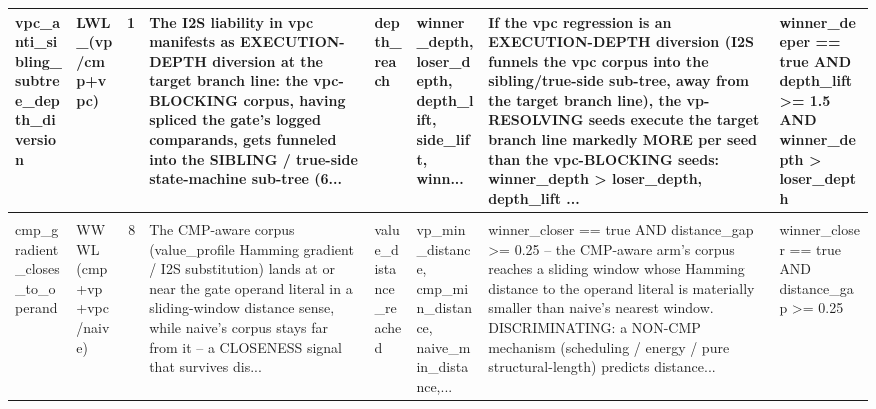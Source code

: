 \documentclass[7pt]{extarticle}
\begin{document}
{\begin{longtable}{@{}p{2.4cm}p{1.9cm}rp{4.3cm}p{1.5cm}p{1.7cm}p{4.6cm}p{3.0cm}@{}}
vpc\_\allowbreak anti\_\allowbreak sibling\_\allowbreak subtree\_\allowbreak depth\_\allowbreak diversion & LWL\_\allowbreak  (vp/cmp+vpc) & 1 & The I2S liability in vpc manifests as EXECUTION-DEPTH diversion at the target branch line: the vpc-BLOCKING corpus, having spliced the gate's logged comparands, gets funneled into the SIBLING / true-side state-machine sub-tree (6... & depth\_\allowbreak reach & winner\_\allowbreak depth, loser\_\allowbreak depth, depth\_\allowbreak lift, side\_\allowbreak lift, winn... & If the vpc regression is an EXECUTION-DEPTH diversion (I2S funnels the vpc corpus into the sibling/true-side sub-tree, away from the target branch line), the vp-RESOLVING seeds execute the target branch line markedly MORE per seed than the vpc-BLOCKING seeds: winner\_\allowbreak depth \textgreater{} loser\_\allowbreak depth, depth\_\allowbreak lift ... & winner\_\allowbreak deeper == true AND depth\_\allowbreak lift \textgreater{}= 1.5 AND winner\_\allowbreak depth \textgreater{} loser\_\allowbreak depth\\
\midrule
\rowcolor{black!10}\multicolumn{8}{@{}l}{\textbf{[VP-pro]\ \ vp\_\allowbreak gradient\_\allowbreak value\_\allowbreak distance\_\allowbreak closure}\quad(final feature, n=28)}\\
cmp\_\allowbreak gradient\_\allowbreak closes\_\allowbreak to\_\allowbreak operand & WWWL (cmp+vp+vpc/naive) & 8 & The CMP-aware corpus (value\_\allowbreak profile Hamming gradient / I2S substitution) lands at or near the gate operand literal in a sliding-window distance sense, while naive's corpus stays far from it -- a CLOSENESS signal that survives dis... & value\_\allowbreak distance\_\allowbreak reached & vp\_\allowbreak min\_\allowbreak distance, cmp\_\allowbreak min\_\allowbreak distance, naive\_\allowbreak min\_\allowbreak distance,... & winner\_\allowbreak closer == true AND distance\_\allowbreak gap \textgreater{}= 0.25 -- the CMP-aware arm's corpus reaches a sliding window whose Hamming distance to the operand literal is materially smaller than naive's nearest window. DISCRIMINATING: a NON-CMP mechanism (scheduling / energy / pure structural-length) predicts distance... & winner\_\allowbreak closer == true AND distance\_\allowbreak gap \textgreater{}= 0.25\\

\end{longtable}}
\end{document}
